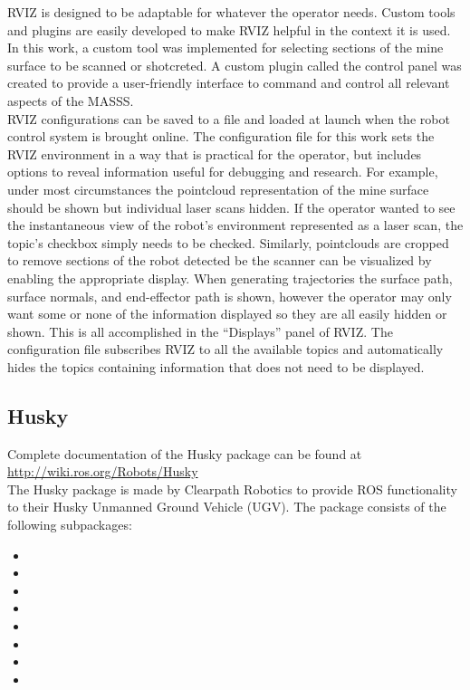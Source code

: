 RVIZ is designed to be adaptable for whatever the operator needs. Custom tools and plugins are easily developed to make RVIZ helpful in the context it is used. In this work, a custom tool was implemented for selecting sections of the mine surface to be scanned or shotcreted. A custom plugin called the control panel was created to provide a user-friendly interface to command and control all relevant aspects of the MASSS.\\

RVIZ configurations can be saved to a file and loaded at launch when the robot control system is brought online. The configuration file for this work sets the RVIZ environment in a way that is practical for the operator, but includes options to reveal information useful for debugging and research. For example, under most circumstances the pointcloud representation of the mine surface should be shown but individual laser scans hidden. If the operator wanted to see the instantaneous view of the robot's environment represented as a laser scan, the topic's checkbox simply needs to be checked. Similarly, pointclouds are cropped to remove sections of the robot detected be the scanner can be visualized by enabling the appropriate display. When generating trajectories the surface path, surface normals, and end-effector path is shown, however the operator may only want some or none of the information displayed so they are all easily hidden or shown. This is all accomplished in the ``Displays'' panel of RVIZ. The configuration file subscribes RVIZ to all the available topics and automatically hides the topics containing information that does not need to be displayed.\\

\subsection{Husky}

Complete documentation of the Husky package can be found at \url{http://wiki.ros.org/Robots/Husky}\\

The Husky package is made by Clearpath Robotics to provide ROS functionality to their Husky Unmanned Ground Vehicle (UGV). The package consists of the following subpackages:

\begin{itemize}
    \item {}
    \item {}
    \item {}
    \item {}
    \item {}
    \item {}
    \item {}
    \item {}
\end{itemize}

